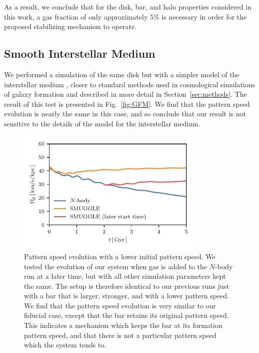\documentclass[twocolumn,linenumbers]{aastex631}
\newcommand{\Nbody}{$N$-body}
\begin{document}
As a result, we conclude that for the disk, bar, and halo properties
considered in this work, a gas fraction of only approximately $5\%$ is
necessary in order for the proposed stabilizing mechanism to operate.



\subsection{Smooth Interstellar Medium}
We performed a simulation of the same disk but with a simpler model of the
interstellar medium \citep{2003MNRAS.339..289S}, closer to standard methods used
in cosmological simulations of galaxy formation and described in more detail in
Section~\ref{sec:methods}. The result of this test is presented in
Fig.~\ref{fig:GFM}. We find that the pattern speed evolution is nearly the same
in this case, and so conclude that our result is not sensitive to the details of
the model for the interstellar medium.

\begin{figure}
    \centering
    \includegraphics[width=9cm]{fig/ps_late_start.pdf}
    \caption{Pattern speed evolution with a lower initial pattern speed. We
    tested the evolution of our system when gas is added to the \Nbody{} run at
    a later time, but with all other simulation parameters kept the same. The
    setup is therefore identical to our previous runs just with a bar that is
    larger, stronger, and with a lower pattern speed. We find that the pattern
    speed evolution is very similar to our fiducial case, except that the bar
    retains its original pattern speed. This indicates a mechanism which keeps
    the bar at its formation pattern speed, and that there is not a particular
    pattern speed which the system tends to.}
    \label{fig:snap700}
\end{figure}
\end{document}
